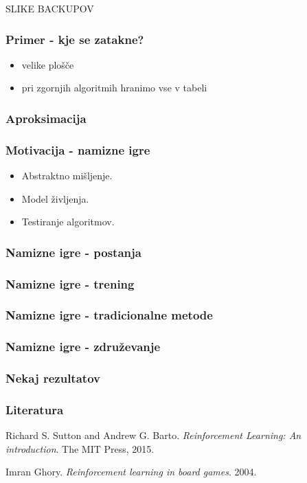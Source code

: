 \documentclass{beamer}    %
\begin{document}
\begin{frame}
    SLIKE BACKUPOV
\end{frame}


\begin{frame}
    \frametitle{Primer - kje se zatakne?}
    \begin{itemize}
        \item velike plošče
        \item pri zgornjih algoritmih hranimo vse v tabeli
    \end{itemize}
\end{frame}


\begin{frame}
    \frametitle{Aproksimacija}
\end{frame}


\begin{frame}
    \frametitle{Motivacija - namizne igre}
    \begin{itemize}
        \item Abstraktno mišljenje.
        \item Model življenja.
        \item Testiranje algoritmov.
    \end{itemize}
\end{frame}


\begin{frame}
    \frametitle{Namizne igre - postanja}
\end{frame}


\begin{frame}
    \frametitle{Namizne igre - trening}
\end{frame}


\begin{frame}
    \frametitle{Namizne igre - tradicionalne metode}
\end{frame}


\begin{frame}
    \frametitle{Namizne igre - združevanje}
\end{frame}


\begin{frame}
    \frametitle{Nekaj rezultatov}
\end{frame}


\begin{frame}
    \frametitle{Literatura}
    \begin{thebibliography}{9}
        Richard S. Sutton and Andrew G. Barto. 
    \textit{Reinforcement Learning: An introduction}.
    The MIT Press, 
    2015.

    \medskip
    \medskip

    Imran Ghory.
    \textit{Reinforcement learning in board games}.
    2004.

    \end{thebibliography}
\end{frame}
\end{document}
